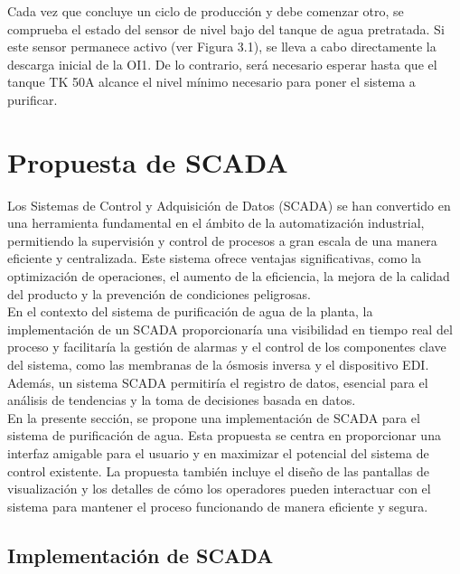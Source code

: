 Cada vez que concluye un ciclo de producción y debe comenzar otro, se comprueba
el estado del sensor de nivel bajo del tanque de agua pretratada. Si este
sensor permanece activo (ver Figura 3.1), se lleva a cabo directamente la
descarga inicial de la OI1. De lo contrario, será necesario esperar hasta que
el tanque TK 50A alcance el nivel mínimo necesario para poner el sistema a purificar.\\




\section{Propuesta de SCADA}
\label{sec:scada_proposal}

Los Sistemas de Control y Adquisición de Datos (SCADA) se han convertido en una herramienta fundamental en el ámbito de la automatización industrial, permitiendo la supervisión y control de procesos a gran escala de una manera eficiente y centralizada. Este sistema ofrece ventajas significativas, como la optimización de operaciones, el aumento de la eficiencia, la mejora de la calidad del producto y la prevención de condiciones peligrosas.\\

En el contexto del sistema de purificación de agua de la planta, la implementación de un SCADA proporcionaría una visibilidad en tiempo real del proceso y facilitaría la gestión de alarmas y el control de los componentes clave del sistema, como las membranas de la ósmosis inversa y el dispositivo EDI. Además, un sistema SCADA permitiría el registro de datos, esencial para el análisis de tendencias y la toma de decisiones basada en datos.\\

En la presente sección, se propone una implementación de SCADA para el sistema de purificación de agua. Esta propuesta se centra en proporcionar una interfaz amigable para el usuario y en maximizar el potencial del sistema de control existente. La propuesta también incluye el diseño de las pantallas de visualización y los detalles de cómo los operadores pueden interactuar con el sistema para mantener el proceso funcionando de manera eficiente y segura.\\

\subsection{Implementación de SCADA}

